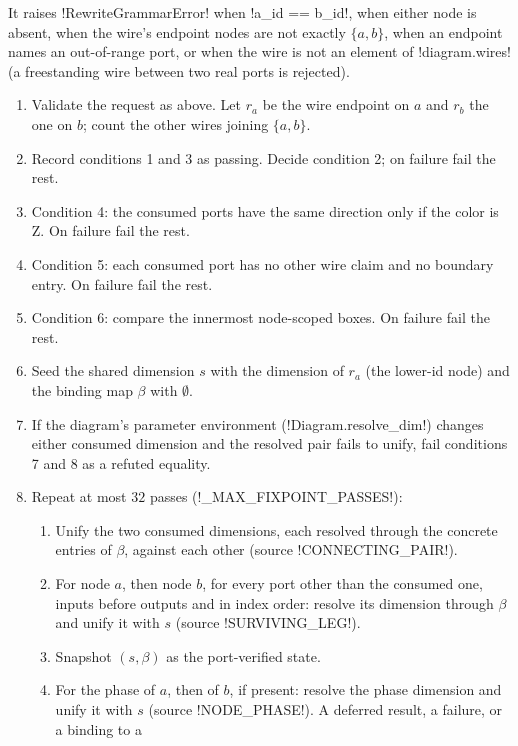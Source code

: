 It raises \py!RewriteGrammarError! when \py!a_id == b_id!, when either node is absent, when the
wire's endpoint nodes are not exactly $\{a, b\}$, when an endpoint names an out-of-range port, or
when the wire is not an element of \py!diagram.wires! (a freestanding wire between two real ports
is rejected).

\begin{algorithm}\label{alg:rewriting-fusion}
\leavevmode
\begin{enumerate}
\item Validate the request as above. Let $r_a$ be the wire endpoint on $a$ and $r_b$ the one on
  $b$; count the other wires joining $\{a,b\}$.
\item Record conditions 1 and 3 as passing. Decide condition 2; on failure fail the rest.
\item Condition 4: the consumed ports have the same direction only if the color is Z. On failure
  fail the rest.
\item Condition 5: each consumed port has no other wire claim and no boundary entry. On failure
  fail the rest.
\item Condition 6: compare the innermost node-scoped boxes. On failure fail the rest.
\item Seed the shared dimension $s$ with the dimension of $r_a$ (the lower-id node) and the
  binding map $\beta$ with $\emptyset$.
\item If the diagram's parameter environment (\py!Diagram.resolve_dim!) changes either consumed
  dimension and the resolved pair fails to unify, fail conditions 7 and 8 as a refuted equality.
\item Repeat at most $32$ passes (\py!_MAX_FIXPOINT_PASSES!):
  \begin{enumerate}
  \item Unify the two consumed dimensions, each resolved through the concrete entries of $\beta$,
    against each other (source \code!CONNECTING_PAIR!).
  \item For node $a$, then node $b$, for every port other than the consumed one, inputs before
    outputs and in index order: resolve its dimension through $\beta$ and unify it with $s$
    (source \code!SURVIVING_LEG!).
  \item Snapshot $(s,\beta)$ as the port-verified state.
  \item For the phase of $a$, then of $b$, if present: resolve the phase dimension and unify it
    with $s$ (source \code!NODE_PHASE!). A deferred result, a failure, or a binding to a

\end{enumerate}
\end{enumerate}
\end{algorithm}

